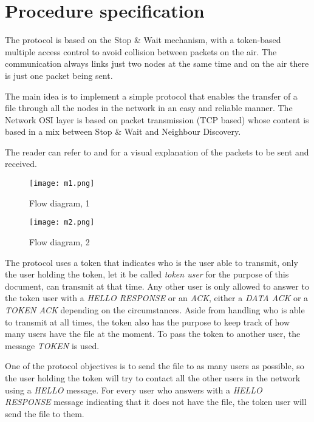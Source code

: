 \chapter{Procedure specification}
The protocol is based on the Stop \& Wait mechanism, with a token-based multiple access control to avoid collision between packets on the air. The communication always links just two nodes at the same time and on the air there is just one packet being sent.

The main idea is to implement a simple protocol that enables the transfer of a file through all the nodes in the network in an easy and reliable manner. The Network OSI layer is based on packet transmission (TCP based) whose content is based in a mix between Stop \& Wait and Neighbour Discovery.

The reader can refer to  and  for a visual explanation of the packets to be sent and received.
\begin{figure}[H] \centering
	\texttt{[image: m1.png]}
	\caption{Flow diagram, 1}
	\label{fig:m1-png}
\end{figure}

\begin{figure}[H] \centering
	\texttt{[image: m2.png]}
	\caption{Flow diagram, 2}
	\label{fig:m2-png}
\end{figure}


The protocol uses a token that indicates who is the user able to transmit, only the user holding the token, let it be called \textit{token user} for the purpose of this document, can transmit at that time. Any other user is only allowed to answer to the token user with a \textit{HELLO RESPONSE} or an \textit{ACK}, either a \textit{DATA ACK} or a \textit{TOKEN ACK} depending on the circumstances. Aside from handling who is able to transmit at all times, the token also has the purpose to keep track of how many users have the file at the moment. To pass the token to another user, the message \textit{TOKEN} is used.

One of the protocol objectives is to send the file to as many users as possible, so the user holding the token will try to contact all the other users in the network using a \textit{HELLO} message. For every user who answers with a \textit{HELLO RESPONSE} message indicating that it does not have the file, the token user will send the file to them.

